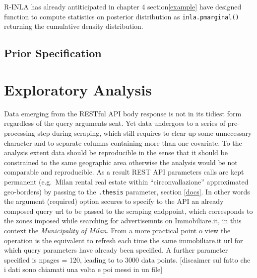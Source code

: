 \documentclass[
  12pt,
  a4paper,
  oneside]{book}
\newcommand{\passthrough}[1]{#1}
\theoremstyle{definition}
\theoremstyle{definition}
\theoremstyle{definition}
\theoremstyle{remark}
\begin{document}
R-INLA has already antiticipated in chapter 4 section\ref{example} have designed function to compute statistics on posterior distribution as \passthrough{\lstinline!inla.pmarginal()!} returning the cumulative density distribution.

\hypertarget{prior-specification}{%
\section{Prior Specification}\label{prior-specification}}

\hypertarget{exploratory}{%
\chapter{Exploratory Analysis}\label{exploratory}}

Data emerging from the RESTful API body response is not in its tidiest form regardless of the query arguments sent. Yet data undergoes to a series of pre-processing step during scraping, which still requires to clear up some unnecessary character and to separate columns containing more than one covariate. To the analysis extent data should be reproducible in the sense that it should be constrained to the same geographic area otherwise the analysis would be not comparable and reproducible. As a result REST API parameters calls are kept permanent (e.g.~Milan rental real estate within ``circonvallazione'' approximated geo-borders) by passing to the \passthrough{\lstinline!.thesis!} parameter, section \ref{docs}. In other words the argument (required) option secures to specify to the API an already composed query url to be passed to the scraping endppoint, which corresponds to the zones imposed while searching for advertisemnts on Immobiliare.it, in this context the \emph{Municipality of Milan}. From a more practical point o view the operation is the equivalent to refresh each time the same immobiliare.it url for which query parameters have already been specified. A further parameter specified is npages = 120, leading to to 3000 data points. {[}discaimer sul fatto che i dati sono chiamati una volta e poi messi in un file{]}
\end{document}
